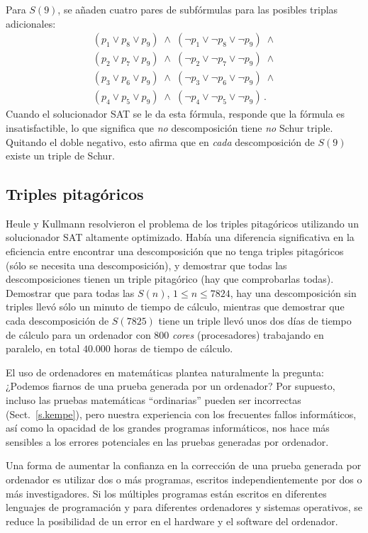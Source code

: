 Para $S(9)$, se añaden cuatro pares de subfórmulas para las posibles triplas adicionales:
\[
\begin{array}{l}
(p_1 \vee p_8 \vee p_9) \;\wedge\; (\neg p_1 \vee \neg p_8 \vee \neg p_9) \;\wedge \\
(p_2 \vee p_7 \vee p_9) \;\wedge\; (\neg p_2 \vee \neg p_7 \vee \neg p_9) \;\wedge \\
(p_3 \vee p_6 \vee p_9) \;\wedge\; (\neg p_3 \vee \neg p_6 \vee \neg p_9) \;\wedge \\
(p_4 \vee p_5 \vee p_9) \;\wedge\; (\neg p_4 \vee \neg p_5 \vee \neg p_9)\,.
\end{array}
\]
Cuando el solucionador SAT se le da esta fórmula, responde que la fórmula es insatisfactible, lo que significa que \emph{no} descomposición tiene \emph{no} Schur triple. Quitando el doble negativo, esto afirma que en \emph{cada} descomposición de $S(9)$ existe un triple de Schur.

\subsection{Triples pitagóricos}

Heule y Kullmann resolvieron el problema de los triples pitagóricos utilizando un solucionador SAT altamente optimizado. Había una diferencia significativa en la eficiencia entre encontrar una descomposición que no tenga triples pitagóricos (sólo se necesita una descomposición), y demostrar que todas las descomposiciones tienen un triple pitagórico (hay que comprobarlas todas). Demostrar que para todas las $S(n)$, $1\leq n\leq 7824$, hay una descomposición sin triples llevó sólo un minuto de tiempo de cálculo, mientras que demostrar que cada descomposición de $S(7825)$ tiene un triple llevó unos dos días de tiempo de cálculo para un ordenador con $800$ \emph{cores} (procesadores) trabajando en paralelo, en total $40.000$ horas de tiempo de cálculo.

El uso de ordenadores en matemáticas plantea naturalmente la pregunta: ¿Podemos fiarnos de una prueba generada por un ordenador? Por supuesto, incluso las pruebas matemáticas ``ordinarias'' pueden ser incorrectas (Sect.~\ref{s.kempe}), pero nuestra experiencia con los frecuentes fallos informáticos, así como la opacidad de los grandes programas informáticos, nos hace más sensibles a los errores potenciales en las pruebas generadas por ordenador.

Una forma de aumentar la confianza en la corrección de una prueba generada por ordenador es utilizar dos o más programas, escritos independientemente por dos o más investigadores. Si los múltiples programas están escritos en diferentes lenguajes de programación y para diferentes ordenadores y sistemas operativos, se reduce la posibilidad de un error en el hardware y el software del ordenador.

